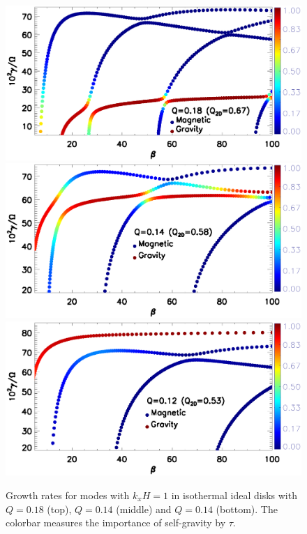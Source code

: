 \begin{figure}
  \includegraphics[width=\linewidth,clip=true,trim=0cm 2.1cm 0cm
    0cm]{figures/compare_growth3_kx1_Q0d18.ps} 
  \includegraphics[width=\linewidth,clip=true,trim=0cm 2.1cm 0cm
    0.5cm]{figures/compare_growth3_kx1_Q0d14.ps} 
  \includegraphics[width=\linewidth,clip=true,trim=0cm 0cm 0cm
    0.5cm]{figures/compare_growth3_kx1_Q0d12.ps} 
  \caption{Growth rates for modes with $k_xH=1$ in isothermal ideal
    disks with $Q=0.18$ (top), $Q=0.14$ (middle) and $Q=0.14$ (bottom). The
    colorbar measures the importance of  
    self-gravity by $\tau$.   
    \label{compare_growth3}}
\end{figure}

